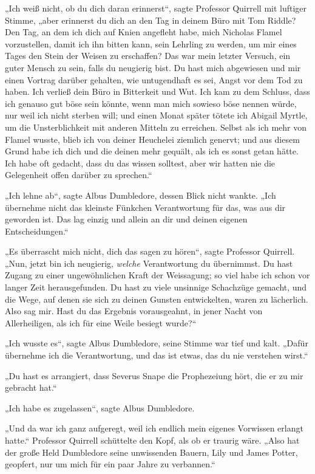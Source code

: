 {„Ich weiß nicht, ob du dich daran erinnerst“, sagte Professor Quirrell mit luftiger Stimme, „aber erinnerst du dich an den Tag in deinem Büro mit Tom Riddle? Den Tag, an dem ich dich auf Knien angefleht habe, mich Nicholas Flamel vorzustellen, damit ich ihn bitten kann, sein Lehrling zu werden, um mir eines Tages den Stein der Weisen zu erschaffen? Das war mein letzter Versuch, ein guter Mensch zu sein, falls du neugierig bist. Du hast mich abgewiesen und mir einen Vortrag darüber gehalten, wie untugendhaft es sei, Angst vor dem Tod zu haben. Ich verließ dein Büro in Bitterkeit und Wut. Ich kam zu dem Schluss, dass ich genauso gut böse sein könnte, wenn man mich sowieso böse nennen würde, nur weil ich nicht sterben will; und einen Monat später tötete ich Abigail Myrtle, um die Unsterblichkeit mit anderen Mitteln zu erreichen. Selbst als ich mehr von Flamel wusste, blieb ich von deiner Heuchelei ziemlich genervt; und aus diesem Grund habe ich dich und die deinen mehr gequält, als ich es sonst getan hätte. Ich habe oft gedacht, dass du das wissen solltest, aber wir hatten nie die Gelegenheit offen darüber zu sprechen.“

„Ich lehne ab“, sagte Albus Dumbledore, dessen Blick nicht wankte. „Ich übernehme nicht das kleinste Fünkchen Verantwortung für das, was aus dir geworden ist. Das lag einzig und allein an dir und deinen eigenen Entscheidungen.“

„Es überrascht mich nicht, dich das sagen zu hören“, sagte Professor Quirrell. „Nun, jetzt bin ich neugierig, \emph{welche} Verantwortung du übernimmst. Du hast Zugang zu einer ungewöhnlichen Kraft der Weissagung; so viel habe ich schon vor langer Zeit herausgefunden. Du hast zu viele unsinnige Schachzüge gemacht, und die Wege, auf denen sie sich zu deinen Gunsten entwickelten, waren zu lächerlich. Also sag mir. Hast du das Ergebnis vorausgeahnt, in jener Nacht von Allerheiligen, als ich für eine Weile besiegt wurde?“

„Ich wusste es“, sagte Albus Dumbledore, seine Stimme war tief und kalt. „Dafür übernehme ich die Verantwortung, und das ist etwas, das du nie verstehen wirst.“

„Du hast es arrangiert, dass Severus Snape die Prophezeiung hört, die er zu mir gebracht hat.“

„Ich habe es zugelassen“, sagte Albus Dumbledore.

„Und da war ich ganz aufgeregt, weil ich endlich mein eigenes Vorwissen erlangt hatte.“ Professor Quirrell schüttelte den Kopf, als ob er traurig wäre. „Also hat der große Held Dumbledore seine unwissenden Bauern, Lily und James Potter, geopfert, nur um mich für ein paar Jahre zu verbannen.“

}
